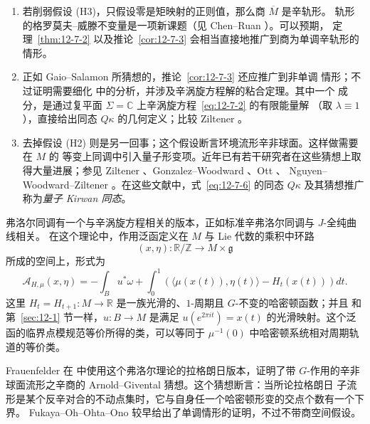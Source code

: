 \begin{remark}[量子 Kirwan 同态]\label{rem:12-7-4}
\begin{enumerate}[label=(\roman*)]
\item 若削弱假设 (H3)，只假设零是矩映射的正则值，那么商 $\overline M$ 是辛轨形。
轨形的格罗莫夫--威滕不变量是一项新课题（见 Chen--Ruan ）。可以预期，
定理~\ref{thm:12-7-2} 以及推论~\ref{cor:12-7-3} 会相当直接地推广到商为单调辛轨形的
情形。

\item 正如 Gaio--Salamon  所猜想的，推论~\ref{cor:12-7-3} 还应推广到非单调
情形；不过证明需要细化  中的分析，并涉及辛涡旋方程解的粘合定理。其中一个
成分，是通过复平面 $\Sigma=\mathbb C$ 上辛涡旋方程~\eqref{eq:12-7-2} 的有限能量解
（取 $\lambda\equiv1$），直接给出同态 $Q\kappa$ 的几何定义；比较 Ziltener
。

\item 去掉假设 (H2) 则是另一回事；这个假设断言环境流形辛非球面。这样做需要在 $M$ 的
等变上同调中引入量子形变项。近年已有若干研究者在这些猜想上取得大量进展；参见
Ziltener 、Gonzalez--Woodward 、Ott 、
Nguyen--Woodward--Ziltener 。在这些文献中，式~\eqref{eq:12-7-6} 的同态
$Q\kappa$ 及其猜想推广称为\emph{量子 Kirwan 同态}。
\end{enumerate}
\end{remark}

\begin{remark}\label{rem:12-7-5}
弗洛尔同调有一个与辛涡旋方程相关的版本，正如标准辛弗洛尔同调与 $J$-全纯曲线相关。
在这个理论中，作用泛函定义在 $M$ 与 Lie 代数的乘积中环路
\[
  (x,\eta):\mathbb R/\mathbb Z\longrightarrow M\times\mathfrak g
\]
所成的空间上，形式为
\[
  \mathcal A_{H,\mu}(x,\eta)
  =-\int_Bu^*\omega
  +\int_0^1\left(
  \langle\mu(x(t)),\eta(t)\rangle-H_t(x(t))
  \right)dt.
\]
这里 $H_t=H_{t+1}:M\to\mathbb R$ 是一族光滑的、$1$-周期且 $G$-不变的哈密顿函数；并且
和第~\ref{sec:12-1} 节一样，$u:B\to M$ 是满足
$u(e^{2\pi it})=x(t)$ 的光滑映射。这个泛函的临界点模规范等价所得的类，可以等同于
$\mu^{-1}(0)$ 中哈密顿系统相对周期轨道的等价类。

Frauenfelder 在  中使用这个弗洛尔理论的拉格朗日版本，证明了带
$G$-作用的辛非球面流形之辛商的 Arnold--Givental 猜想。这个猜想断言：当所论拉格朗日
子流形是某个反辛对合的不动点集时，它与自身任一个哈密顿形变的交点个数有一个下界。
Fukaya--Oh--Ohta--Ono  较早给出了单调情形的证明，不过不带商空间假设。
\end{remark}
